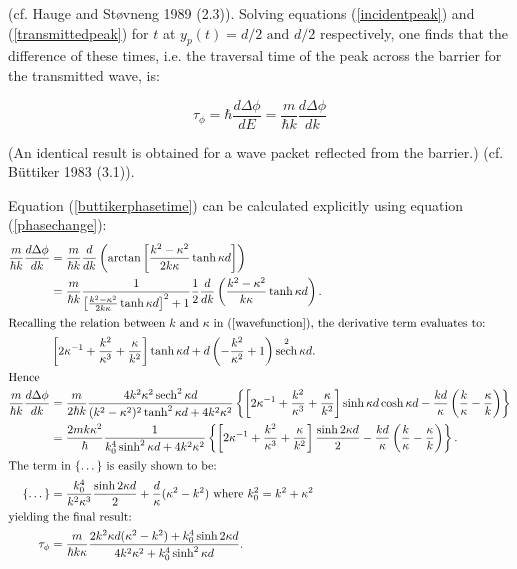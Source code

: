 \documentclass{article}
\DeclareMathOperator{\sech}{sech}
\begin{document}
\noindent (cf. Hauge and St{\o}vneng 1989 (2.3)). Solving equations (\ref{incidentpeak}) and (\ref{transmittedpeak}) for $t$ at $y_p(t) = d/2 \text{ and } d/2$ respectively, one finds that the difference of these times, i.e. the traversal time of the peak across the barrier for the transmitted wave, is:

\begin{equation}
	\tau_\phi = \hbar \frac{d\Delta\phi}{dE} = \frac{m}{\hbar k}\frac{d\Delta\phi}{dk}
	\label{buttikerphasetime}
\end{equation}

\noindent (An identical result is obtained for a wave packet reflected from the barrier.) (cf. B{\"u}ttiker 1983 (3.1)).

Equation (\ref{buttikerphasetime}) can be calculated explicitly using equation (\ref{phasechange}):
\begin{subequations}
\begin{align}
	\frac{m}{\hbar k}\frac{d\Delta\phi}{dk}&=\frac{m}{\hbar k}\frac{d}{dk}\left(\arctan{\left[\frac{k^2-\kappa^2}{2k\kappa}\tanh{\kappa d}\right]}\right) \\
					       &=\frac{m}{\hbar k}\frac{1}{\left[\frac{k^2-\kappa^2}{2k\kappa}\tanh{\kappa d}\right]^2+1}\frac{1}{2}\frac{d}{dk}\left(\frac{k^2-\kappa^2}{k\kappa}\tanh{\kappa d}\right). \\ \intertext{Recalling the relation between $k$ and $\kappa$ in (\ref{wavefunction}), the derivative term evaluates to:}
					       &\left[2\kappa^{-1}+\frac{k^2}{\kappa^3}+\frac{\kappa}{k^2}\right]\tanh{\kappa d} + d\left(-\frac{k^2}{\kappa^2}+1\right)\sech^2{\kappa d}.\\ \intertext{Hence}
	\frac{m}{\hbar k}\frac{d\Delta\phi}{dk}&=\frac{m}{2\hbar k}\frac{4k^2\kappa^2\sech^2{\kappa d}}{(k^2-\kappa^2)^2\tanh^2{\kappa d}+4k^2\kappa^2}\left\{\left[2\kappa^{-1}+\frac{k^2}{\kappa^3}+\frac{\kappa}{k^2}\right]\sinh{\kappa d}\cosh{\kappa d}-\frac{kd}{\kappa}\left(\frac{k}{\kappa}-\frac{\kappa}{k}\right)\right\}\\
					       &=\frac{2mk\kappa^2}{\hbar}\frac{1}{k_0^4\sinh^2{\kappa d}+4k^2\kappa^2}\left\{\left[2\kappa^{-1}+\frac{k^2}{\kappa^3}+\frac{\kappa}{k^2}\right]\frac{\sinh{2\kappa d}}{2}-\frac{kd}{\kappa}\left(\frac{k}{\kappa}-\frac{\kappa}{k}\right)\right\}. \\ \intertext{The term in \{\dots\} is easily shown to be:}
	\{\dots\} &= \frac{k_0^4}{k^2\kappa^3}\frac{\sinh{2\kappa d}}{2}+\frac{d}{\kappa}(\kappa^2-k^2) \text{ where } k_0^2 = k^2+\kappa^2\\ \intertext{yielding the final result:}
	\tau_\phi &= \frac{m}{\hbar k \kappa}\frac{2k^2\kappa d(\kappa^2-k^2)+k_0^4\sinh{2\kappa d}}{4k^2\kappa^2+k_0^4\sinh^2{\kappa d}}. \label{phasedelaytime}
\end{align}
\end{subequations}
\end{document}
